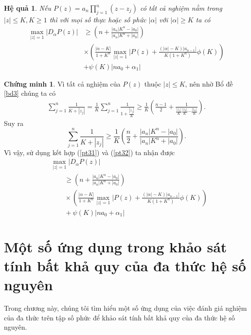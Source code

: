 \documentclass[a5paper,12pt]{report}
\theoremstyle{definition}
\newtheorem*{chungminh}{Chứng minh}
\newtheorem{hequa}[dinhly]{Hệ quả}
\newcommand{\cm}{\begin{chungminh}}
\newcommand{\hcm}{\end{chungminh}}
\newcommand{\hq}{\begin{hequa}\itshape}
\newcommand{\hhq}{\end{hequa}}
\def\geq{\geqslant}
\numberwithin{equation}{chapter}
\def\vt{\vert}
\def\vt{\vert}
\def\vt{\vert}
\begin{document}
	\hq \label{hq33} Nếu $P(z)=a_n\prod_{j=1}^n(z-z_j)$ có tất cả nghiệm nằm trong $|z|\le K, K \ge 1$ thì với mọi số thực hoặc số phức $|\alpha|$ với $|\alpha| \ge K$ ta có
	\begin{equation*}
		\begin{aligned}
			\max\limits_{\vt z \vt =1}|D_\alpha P(z)|
			& \ge \left(n+\frac{|a_n|K^n-|a_0|}{|a_n|K^n+|a_0|}\right) \\
			& \times \left(\frac{|\alpha-K|}{1+K^n}\max\limits_{\vt z \vt =1}|P(z)+\frac{(|\alpha|-K)|a_{n-1}|}{K(1+K^n)}\phi(K)\right) \\
			& +\psi(K)|na_0+\alpha_1|
		\end{aligned}
	\end{equation*}
	\hhq
	\cm
	Vì tất cả nghiệm của $P(z)$ thuộc $|z|\le K$, nên nhờ Bổ đề \ref{bd3} chúng ta có
	\[\begin{aligned} \sum_{j=1}^n\frac{1}{K+|z_j|}=\frac{1}{K}\sum_{j=1}^n\frac{1}{1+\frac{|z_j|}{K}}\ge \frac{1}{K}\left(\frac{n-1}{2}+\frac{1}{\frac{|z_1|}{K}\frac{|z_2|}{K}\cdots \frac{|z_n|}{K}}\right).
	\end{aligned}\]
	Suy ra
	\begin{equation}\label{pt32}
		\sum_{j=1}^n\frac{1}{K+|z_j|}
		\ge\frac{1}{K}\left(\frac{n}{2}+\frac{|a_n|K^n-|a_0|}{|a_n|K^n+|a_0|}\right).
	\end{equation}
	Vì vậy, sử dụng kết hợp (\ref{pt31}) và (\ref{pt32}) ta nhận được
	\begin{equation*}
		\begin{aligned}
			&\max\limits_{\vt z \vt=1}|D_\alpha P(z)| \\
			&\qquad \geq \left(n+\frac{|a_n|K^n-|a_0|}{|a_n|K^n+|a_0|}\right) \\
			&\qquad \times \left(\frac{|\alpha-K|}{1+K^n}\max\limits_{\vt z \vt=1}|P(z)+\frac{(|\alpha|-K)|a_{n-1}|}{K(1+K^n)}\phi(K)\right) \\
			&\qquad +\psi(K)|na_0+\alpha_1|
		\end{aligned}
	\end{equation*}
	\hcm
	
	
	\chapter{Một số ứng dụng trong khảo sát tính bất khả quy của đa thức hệ số nguyên}
	Trong chương này, chúng tôi tìm hiểu một số ứng dụng của việc đánh giá nghiệm của đa thức trên tập số phức để khảo sát tính bất khả quy của đa thức hệ số nguyên.
\end{document}

